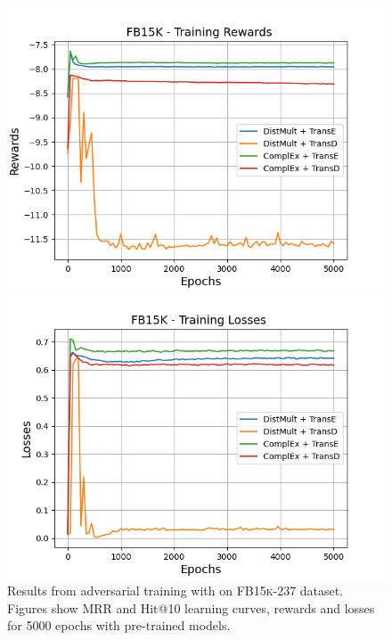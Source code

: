 \begin{figure}
    \begin{minipage}{.5\textwidth}
      \centering
      \includegraphics[width=\linewidth]{figures/results/gan_train/pretrained/uncertainty/max/entropy/fb15k/5k_epochs/uncertainty_fb15k_rew.png}
    \end{minipage}%
     \begin{minipage}{.5\textwidth}
      \centering
      \includegraphics[width=\linewidth]{figures/results/gan_train/pretrained/uncertainty/max/entropy/fb15k/5k_epochs/uncertainty_fb15k_losses.png}
    \end{minipage}%
    \caption{Results from adversarial training with \usmax on \textsc{FB15k-237} dataset.
    Figures show MRR and Hit@10 learning curves, rewards and losses for 5000 epochs with pre-trained models.}
    \label{fig:gan_train_pretrained_usmax_fb15k}
\end{figure}


